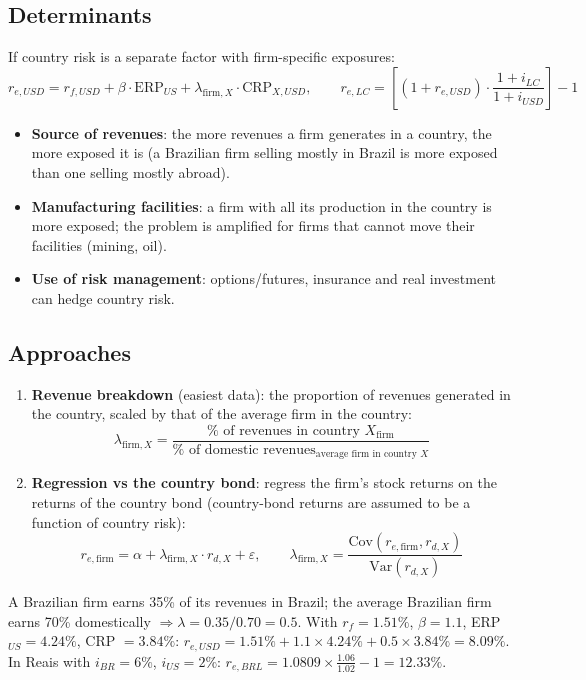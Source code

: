 \subsection{Determinants}
If country risk is a separate factor with firm-specific exposures:
\[
r_{e,USD}=r_{f,USD}+\beta\cdot\text{ERP}_{US}+\lambda_{\text{firm},X}\cdot\text{CRP}_{X,USD},\qquad r_{e,LC}=\left[(1+r_{e,USD})\cdot\frac{1+i_{LC}}{1+i_{USD}}\right]-1
\]
\begin{itemize}
  \item \textbf{Source of revenues}: the more revenues a firm generates in a country, the more exposed it is (a Brazilian firm selling mostly in Brazil is more exposed than one selling mostly abroad).
  \item \textbf{Manufacturing facilities}: a firm with all its production in the country is more exposed; the problem is amplified for firms that cannot move their facilities (mining, oil).
  \item \textbf{Use of risk management}: options/futures, insurance and real investment can hedge country risk.
\end{itemize}

\subsection{Approaches}
\begin{enumerate}
  \item \textbf{Revenue breakdown} (easiest data): the proportion of revenues generated in the country, scaled by that of the average firm in the country:
  \[
  \lambda_{\text{firm},X}=\frac{\%\text{ of revenues in country }X_{\text{firm}}}{\%\text{ of domestic revenues}_{\text{average firm in country }X}}
  \]
  \item \textbf{Regression vs the country bond}: regress the firm's stock returns on the returns of the country bond (country-bond returns are assumed to be a function of country risk):
  \[
  r_{e,\text{firm}}=\alpha+\lambda_{\text{firm},X}\cdot r_{d,X}+\varepsilon,\qquad \lambda_{\text{firm},X}=\frac{\text{Cov}(r_{e,\text{firm}},r_{d,X})}{\text{Var}(r_{d,X})}
  \]
\end{enumerate}
\begin{exbox}
A Brazilian firm earns 35\% of its revenues in Brazil; the average Brazilian firm earns 70\% domestically $\Rightarrow\lambda=0.35/0.70=0.5$. With $r_f=1.51\%$, $\beta=1.1$, ERP$_{US}=4.24\%$, CRP $=3.84\%$: $r_{e,USD}=1.51\%+1.1\times4.24\%+0.5\times3.84\%=8.09\%$.\\
In Reais with $i_{BR}=6\%$, $i_{US}=2\%$: $r_{e,BRL}=1.0809\times\frac{1.06}{1.02}-1=12.33\%$.
\end{exbox}

